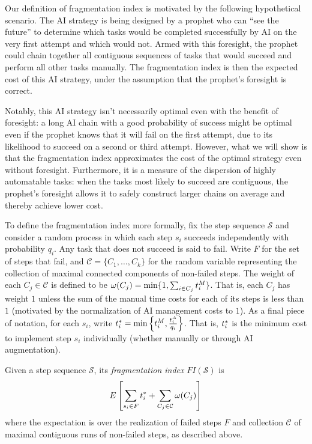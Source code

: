 Our definition of fragmentation index is motivated by the following hypothetical scenario. The AI strategy is being designed by a prophet who can ``see the future'' to determine which tasks would be completed successfully by AI on the very first attempt and which would not. Armed with this foresight, the prophet could chain together all contiguous sequences of tasks that would succeed and perform all other tasks manually. The fragmentation index is then the expected cost of this AI strategy, under the assumption that the prophet's foresight is correct. 

Notably, this AI strategy isn't necessarily optimal even with the benefit of foresight: a long AI chain with a good probability of success might be optimal even if the prophet knows that it will fail on the first attempt, due to its likelihood to succeed on a second or third attempt. However, what we will show is that the fragmentation index approximates the cost of the optimal strategy even without foresight. Furthermore, it is a measure of the dispersion of highly automatable tasks: when the tasks most likely to succeed are contiguous, the prophet's foresight allows it to safely construct larger chains on average and thereby achieve lower cost.

To define the fragmentation index more formally, fix the step sequence $\mathcal{S}$ and consider a random process in which each step $s_i$ succeeds independently with probability $q_i$. Any task that does not succeed is said to fail.  
Write $F$ for the set of steps that fail, and $\mathcal{C} = \{C_1, \dotsc, C_k\}$ for the random variable representing the collection of maximal connected components of non-failed steps.
The weight of each $C_j \in \mathcal{C}$ is defined to be $\omega(C_j) = \min\{ 1, \sum_{i \in C_j} t^{M}_{i} \}$.  
That is, each $C_j$ has weight $1$ unless the sum of the manual time costs for each of its steps is less than $1$ (motivated by the normalization of AI management costs to $1$).
As a final piece of notation, for each $s_i$, write $t^*_{i} = \min\left\{t^{M}_{i}, \frac{t^{A}_{i}}{q_i}\right\}$.  That is, $t^*_{i}$ is the minimum cost to implement step $s_i$ individually (whether manually or through AI augmentation).  

\begin{definition}
Given a step sequence $\mathcal{S}$, its \emph{fragmentation index} $FI(\mathcal{S})$ is 
\[ E\left[\sum_{s_i \in F}t^*_{i} + \sum_{C_j \in \mathcal{C}} \omega(C_j) \right] \]
where the expectation is over the realization of failed steps $F$ and collection $\mathcal{C}$ of maximal contiguous runs of non-failed steps, as described above.
\end{definition}

